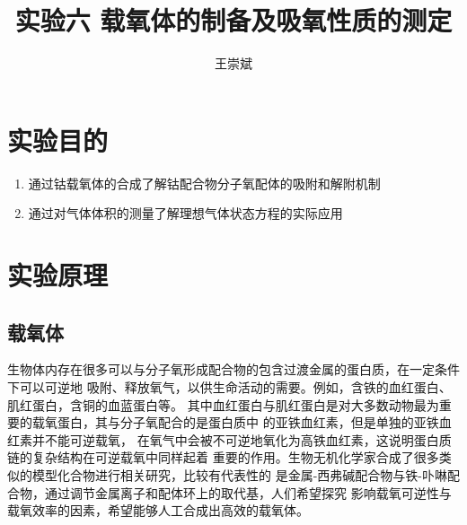 \documentclass[a4paper,zihao=5,UTF8]{ctexart}
\title{\textbf{实验六 \ce{Co(II)(Salen)}载氧体的制备及吸氧性质的测定}\cite{inorganic_chemistry_1}}
\author{王崇斌\;1800011716}
\begin{document}
	\pagestyle{fancy}
	\pagestyle{fancy}
	\chead{}
	\rhead{\today}
	\maketitle
    \thispagestyle{fancy}

    \section{实验目的}
    \begin{enumerate}
        \item 通过钴载氧体的合成了解钴配合物分子氧配体的吸附和解附机制
        \item 通过对气体体积的测量了解理想气体状态方程的实际应用
    \end{enumerate}
    \section{实验原理}
    \subsection{载氧体}
    生物体内存在很多可以与分子氧形成配合物的包含过渡金属的蛋白质，在一定条件下可以可逆地
    吸附、释放氧气，以供生命活动的需要。例如，含铁的血红蛋白、肌红蛋白，含铜的血蓝蛋白等。
    其中血红蛋白与肌红蛋白是对大多数动物最为重要的载氧蛋白，其与分子氧配合的是蛋白质中
    的亚铁血红素，但是单独的亚铁血红素并不能可逆载氧\cite{comprehensive_inorganic_chemistry}，
    在氧气中会被不可逆地氧化为高铁血红素，这说明蛋白质链的复杂结构在可逆载氧中同样起着
    重要的作用。生物无机化学家合成了很多类似的模型化合物进行相关研究，比较有代表性的
    是金属-西弗碱配合物与铁-卟啉配合物，通过调节金属离子和配体环上的取代基，人们希望探究
    影响载氧可逆性与载氧效率的因素，希望能够人工合成出高效的载氧体。
\end{document}
